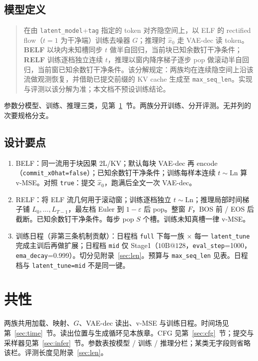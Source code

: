 \documentclass[UTF8,a4paper,11pt]{ctexart}
\begin{document}
\subsection{模型定义}

\begin{quote}
在由 \texttt{latent\_model}+\texttt{tag} 指定的 token 对齐隐空间上，以 ELF 的 rectified flow（\(t=1\) 为干净端）训练去噪器 \(G\)；推理时 \(\hat x_0\) 走 VAE-dec 读 token。\textbf{BELF} 以块内未知槽同步 \(t\) 做半自回归，当前块已知余数钉干净条件；\textbf{RELF} 训练逐档独立连续 \(t\)，推理以窗内降序梯子逐步 pop 做滚动半自回归，当前窗已知余数钉干净条件。该分解规定：两族均在连续隐空间上沿该流做观测恢复，并借助已提交前缀的 KV cache 生成至 \texttt{max\_seq\_len}。实现与评测以该分解为准；本文档不预设训练结论。
\end{quote}

参数分模型、训练、推理三类，见第~\ref{sec:common}~节。两族分开训练、分开评测。无并列的次要规格分支。

\subsection{设计要点}

\begin{enumerate}
  \item BELF：同一流用于块因果 2L/KV；默认每块 VAE-dec 再 encode（\texttt{commit\_x0hat=false}）；已知余数钉干净条件；训练每样本连续 \(t\sim\mathrm{Ln}\) 算 v-MSE。对照 \texttt{true}：提交 \(\hat x_0\)，跑满后全文一次 VAE-dec。
  \item RELF：将 ELF 流几何用于滚动窗；训练逐档独立 \(t\sim\mathrm{Ln}\)；推理局部时间梯子铺 \(L_0,\ldots,L_{T-1}\)，最左档 Euler 到 \(1-\varepsilon\) 后 pop。整窗 \(F\)，BOS 前 / EOS 后截断。已知余数钉干净条件。每步 pop \(S\) 个槽。训练未知真槽一律 v-MSE。
  \item 训练日程（非第三条机制贡献）：日程档 \texttt{full} 下每一族 \(\times\) 每一 \texttt{latent\_tune} 完成主训后再做扩展；日程档 \texttt{mid} 仅 Stage1（\(10\mathrm{B}@128\)，\texttt{eval\_step}=1000，\texttt{ema\_decay}=0.999）。切分见附录~\ref{sec:len}。预算与 \texttt{max\_seq\_len} 见表。日程档与 \texttt{latent\_tune=mid} 不是同一键。
\end{enumerate}

\section{共性}
\label{sec:common}

两族共用加载、映射、\(G\)、VAE-dec 读出、v-MSE 与训练日程。时间场见第~\ref{sec:time}~节。读出位置与生成循环见本族章。CFG 见第~\ref{sec:cfg}~节；提交与采样器见第~\ref{sec:infer}~节。参数表按模型 / 训练 / 推理分栏；某类无字段则省略该栏。评测长度见附录~\ref{sec:len}。
\end{document}
